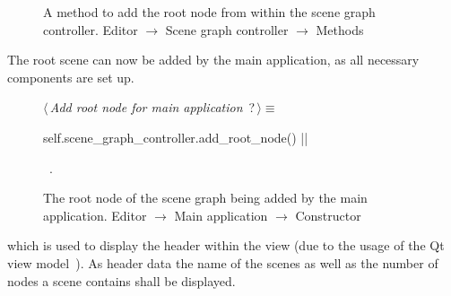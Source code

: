\documentclass[%
    a4paper,    %
    justified,  %
    nobib,      %
    openany     %
]{tufte-book}
\begin{document}
\begin{figure}
\begin{flushleft}
\begin{minipage}{\linewidth}
\begin{list}{}{\setlength{\itemsep}{-\parsep}\setlength{\itemindent}{-\leftmargin}}
\item{}
\end{list}
\end{minipage}\vspace{4ex}
\end{flushleft}
\caption{A method to add the root node from within the scene graph controller.
  \newline{}\newline{}Editor $\rightarrow$ Scene graph controller $\rightarrow$
  Methods}
\label{editor:lst:scene-graph-controller:methods:add-root-node}
\end{figure}

The root scene can now be added by the main application, as all necessary
components are set up.

\begin{figure}
\begin{flushleft} \small
\begin{minipage}{\linewidth}\label{scrap29}\raggedright\small
{} $\langle\,${\itshape Add root node for main application}\nobreak\ {\footnotesize {?}}$\,\rangle\equiv$
\vspace{-1ex}
\begin{pythoncode}
self.scene_graph_controller.add_root_node()
|\NWsep|
\end{pythoncode}
\vspace{1.5ex}
\footnotesize
\begin{list}{}{\setlength{\itemsep}{-\parsep}\setlength{\itemindent}{-\leftmargin}}
\item \NWtxtMacroRefIn\ .

\item{}
\end{list}
\end{minipage}\vspace{4ex}
\end{flushleft}
\caption{The root node of the scene graph being added by the main application.
  \newline{}\newline{}Editor $\rightarrow$ Main application $\rightarrow$
  Constructor}
\label{editor:lst:main-application:constructor:add-root-node}
\end{figure}

 which
is used to display the header within the view (due to the usage of the Qt view
model~). As header data the name of the
scenes as well as the number of nodes a scene contains shall be displayed.
\end{document}
